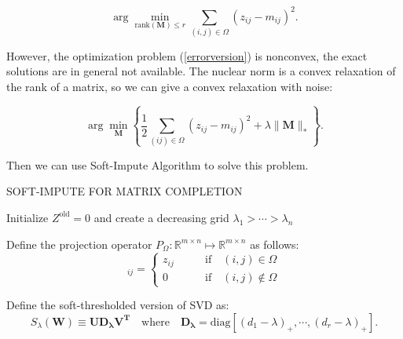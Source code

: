 \documentclass{article}
\begin{document}
\begin{equation}\label{errorversion}
\arg \min_{\mathrm{rank}(\mathbf{M})\le r} \sum_{(i,j) \in \Omega}(z_{ij} - m_{ij})^2.
\end{equation}

However, the optimization problem (\ref{errorversion}) is nonconvex, the exact solutions are in general not available. The nuclear norm is a convex relaxation of the rank of a matrix, so we can give a convex relaxation with noise:

\begin{equation}
\arg \min_{\mathbf{M}} \left\{ \frac{1}{2}\sum_{(ij) \in \Omega}(z_{ij}-m_{ij})^2 + \lambda \| \mathbf{M} \|_{\ast}  \right\}.
\end{equation}

Then we can use Soft-Impute Algorithm to solve this problem.

	\begin{algorithm}
		\caption{SOFT-IMPUTE FOR MATRIX COMPLETION\cite{mazumder2010spectral}}
		\begin{algorithmic}[1]
			\State Initialize $Z^{\mathrm{old}} = 0$ and create a decreasing grid $\lambda_1>\cdots > \lambda_n$
			\EndFor
		\end{algorithmic}
	\end{algorithm}

Define the projection operator $P_{\Omega}:\mathbb{R}^{m\times n} \mapsto \mathbb{R}^{m\times n}$ as follows:
\begin{equation}
[P_{\Omega}(\mathbf{Z})]_{ij} = \begin{cases}
z_{ij}  \qquad & \mathrm{if} \quad (i,j)\in\Omega\\
0 \qquad & \mathrm{if} \quad (i,j) \notin \Omega
\end{cases}
\end{equation}

Define the soft-thresholded version of SVD as:
\begin{equation}
S_{\lambda}(\mathbf{W}) \equiv \mathbf{UD_{\lambda}V^T} \quad \mathrm{where} \quad \mathbf{D_{\lambda}} = \mathrm{diag}[(d_1 - \lambda)_{+},\cdots,(d_r - \lambda)_{+}].
\end{equation}
\end{document}
